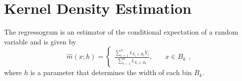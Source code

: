 \section{Kernel Density Estimation}



\begin{definition}[Regressogram]
	The regressogram is an estimator of the conditional expectation of a random variable and is given by \[
		\hat{m}(x;h) = \begin{cases} \frac{\sum_{i=1}^{n} \mathds{1}_{X_i \in B_k} Y_i}{\sum_{i-1}^{n} \mathds{1}_{X_i \in B_k}}, \quad &x \in B_k
		\end{cases}
	,\]
	where $h$ is a parameter that determines the width of each bin $B_k$.
\end{definition}




